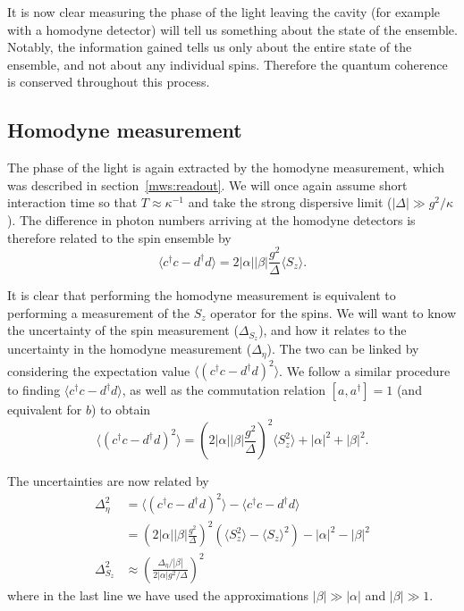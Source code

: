 It is now clear measuring the phase of the light leaving the cavity
(for example with a homodyne detector) will tell us something about
the state of the ensemble. Notably, the information gained tells us only about
the entire state of the ensemble, and not about any individual spins. Therefore
the quantum coherence is conserved throughout this process.

\subsection{Homodyne measurement}

The phase of the light is again extracted by the homodyne measurement, which
was described in section~\ref{mws:readout}. We will once again assume short
interaction time so that $T\approx\kappa^{-1}$ and take the strong dispersive
limit ($|\Delta| \gg g^2/\kappa$). The difference in photon numbers arriving at
the homodyne detectors is therefore related to the spin ensemble by
%
\begin{equation}
  \langle c^\dagger c - d^\dagger d\rangle = 2|\alpha||\beta|
  \frac{g^2}{\Delta}\langle S_z\rangle.
  \label{eqn:homomeas}
\end{equation}

It is clear that performing the homodyne measurement is equivalent to
performing a measurement of the $S_z$ operator for the spins. We will want to
know the uncertainty of the spin measurement ($\Delta_{S_z}$), and how it
relates to the uncertainty in the homodyne measurement ($\Delta_\eta$). The two
can be linked by considering the expectation value $\langle (c^\dagger c -
d^\dagger d)^2 \rangle$.
We follow a similar procedure to finding $\langle c^\dagger c - d^\dagger d
\rangle$, as well as the commutation relation $[a,a^\dagger] = 1$ (and
equivalent for $b$) to obtain
%
\begin{equation}
  \langle (c^\dagger c - d^\dagger d)^2 \rangle = (2|\alpha||\beta|
  \frac{g^2}{\Delta})^2\langle S_z^2\rangle + |\alpha|^2+|\beta|^2.
\end{equation}

The uncertainties are now related by
%
\begin{align}
  \Delta_\eta^2 &= \langle (c^\dagger c - d^\dagger d)^2 \rangle - \langle
  c^\dagger c - d^\dagger d\rangle \\
  &= (2|\alpha||\beta| \frac{g^2}{\Delta})^2(\langle S_z^2\rangle - \langle
  S_z\rangle^2) - |\alpha|^2 - |\beta|^2 \\
  \Delta_{S_z}^2 &\approx
  \left(\frac{\Delta_\eta/|\beta|}{2|\alpha|g^2/\Delta}\right)^2
  \label{squeeze:eqn:homouncert}
\end{align}
%
where in the last line we have used the approximations $|\beta| \gg |\alpha|$
and $|\beta|\gg 1$.

